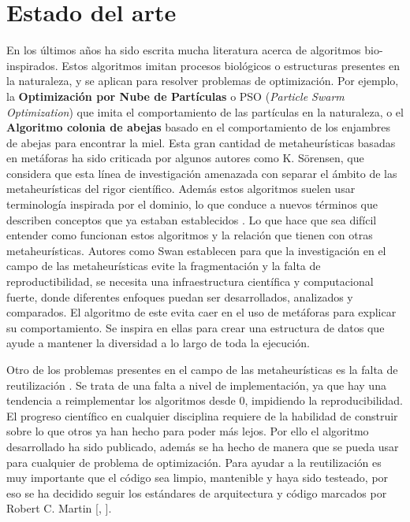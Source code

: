\chapter{Estado del arte}

En los últimos años ha sido escrita mucha literatura acerca de algoritmos bio-inspirados. Estos algoritmos imitan procesos biológicos o estructuras presentes
en la naturaleza, y se aplican para resolver problemas de optimización. Por ejemplo, la \textbf{Optimización por Nube de Partículas} o PSO (\textit{Particle Swarm Optimization})
que imita el comportamiento de las partículas en la naturaleza, o el \textbf{Algoritmo colonia de abejas} basado en el comportamiento de los enjambres de abejas
para encontrar la miel. Esta gran cantidad de metaheurísticas basadas en metáforas ha sido criticada por algunos autores como K. Sörensen\cite{https://doi.org/10.1111/itor.12001},
que considera que esta línea de investigación amenazada con separar el ámbito de las metaheurísticas del rigor científico. Además estos algoritmos suelen usar terminología inspirada por el dominio,
lo que conduce a nuevos términos que describen conceptos que ya estaban establecidos \cite{mitigating_metaphors}. Lo que hace que sea difícil entender como funcionan estos algoritmos
y la relación que tienen con otras metaheurísticas. Autores como Swan \cite{metaheuristics} establecen para que la investigación en el campo de las metaheurísticas evite la fragmentación y 
la falta de reproductibilidad, se necesita una infraestructura científica y computacional fuerte, donde diferentes enfoques puedan ser desarrollados, analizados y comparados. El algoritmo de este 
evita caer en el uso de metáforas para explicar su comportamiento. Se inspira en ellas para crear una estructura de datos que ayude a mantener la diversidad a lo largo de toda la ejecución.

Otro de los problemas presentes en el campo de las metaheurísticas es la falta de reutilización \cite{metaheuristics}. Se trata de una falta a nivel de implementación, ya que hay una
tendencia a reimplementar los algoritmos desde 0, impidiendo la reproducibilidad. El progreso científico en cualquier disciplina requiere de la habilidad de construir sobre lo que
otros ya han hecho para poder más lejos. Por ello el algoritmo desarrollado ha sido publicado, además se ha hecho de manera que se pueda usar para cualquier de problema de optimización.
Para ayudar a la reutilización es muy importante que el código sea limpio, mantenible y haya sido testeado, por eso se ha decidido seguir los estándares de arquitectura y código marcados 
por Robert C. Martin [\cite{cleanArquitecture2017}, \cite{cleanCode2008}].

